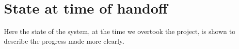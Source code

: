\chapter{State at time of handoff}\label{app:state-at-handoff}

Here the state of the system, at the time we overtook the project, is shown to describe the progress made more clearly.




